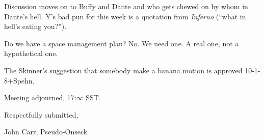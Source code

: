 \documentclass[10pt]{article}
\begin{document}
Discussion moves on to Buffy and Dante and who gets chewed on by
whom in Dante's hell.  Y's bad pun for this week is a quotation
from {\it Inferno} (``what in hell's eating you?'').

Do we have a space management plan?  No.  We need one.  A real
one, not a hypothetical one.

The Skinner's suggestion that somebody make a banana motion is
approved \hbox{10-1-8+Spehn}.

\vspace{12pt}

\noindent
Meeting adjourned, 17:$\infty$ SST.

\vspace{18pt}

\centerline{Respectfully submitted,}
\centerline{John Carr, Pseudo-Onseck}
\end{document}
